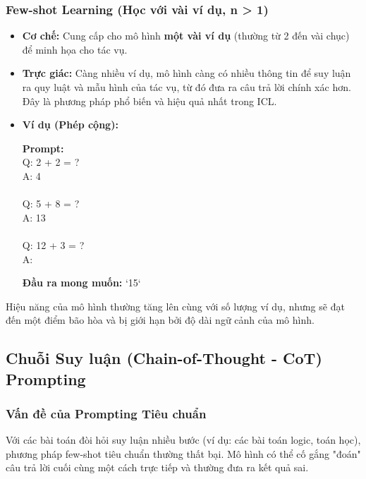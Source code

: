 \subsubsection{Few-shot Learning (Học với vài ví dụ, n > 1)}
\begin{itemize}
    \item \textbf{Cơ chế:} Cung cấp cho mô hình \textbf{một vài ví dụ} (thường từ 2 đến vài chục) để minh họa cho tác vụ.
    \item \textbf{Trực giác:} Càng nhiều ví dụ, mô hình càng có nhiều thông tin để suy luận ra quy luật và mẫu hình của tác vụ, từ đó đưa ra câu trả lời chính xác hơn. Đây là phương pháp phổ biến và hiệu quả nhất trong ICL.
    \item \textbf{Ví dụ (Phép cộng):}
        \begin{tcolorbox}[colback=gray!5!white, colframe=gray!50!black]
        \textbf{Prompt:} \\
        Q: 2 + 2 = ? \\
        A: 4 \\
        \\
        Q: 5 + 8 = ? \\
        A: 13 \\
        \\
        Q: 12 + 3 = ? \\
        A: 
        \end{tcolorbox}
        \textbf{Đầu ra mong muốn:} `15`
\end{itemize}
Hiệu năng của mô hình thường tăng lên cùng với số lượng ví dụ, nhưng sẽ đạt đến một điểm bão hòa và bị giới hạn bởi độ dài ngữ cảnh của mô hình.

\subsection{Chuỗi Suy luận (Chain-of-Thought - CoT) Prompting}
\label{ssec:chain_of_thought}

\subsubsection{Vấn đề của Prompting Tiêu chuẩn}
Với các bài toán đòi hỏi suy luận nhiều bước (ví dụ: các bài toán logic, toán học), phương pháp few-shot tiêu chuẩn thường thất bại. Mô hình có thể cố gắng "đoán" câu trả lời cuối cùng một cách trực tiếp và thường đưa ra kết quả sai.

